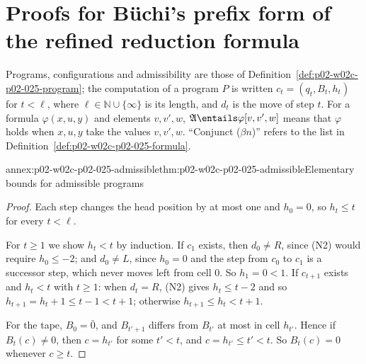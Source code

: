 \section{Proofs for B\"uchi's prefix form of the refined reduction formula}
\label{sec:annex-p02-w02c-p02-025-buchi-form}

Programs, configurations and admissibility are those of
Definition~\ref{def:p02-w02c-p02-025-program}; the computation of a program
\(P\) is written \(c_t=(q_t,B_t,h_t)\) for \(t<\ell\), where
\(\ell\in\mathbb N\cup\{\infty\}\) is its length, and \(d_t\) is the move of
step \(t\).  For a formula \(\varphi(x,u,y)\) and elements \(v,v',w\),
\(\mathfrak A\entails\varphi[v,v',w]\) means that \(\varphi\) holds when
\(x,u,y\) take the values \(v,v',w\).  ``Conjunct (\(\beta\)\(n\))'' refers to
the list in Definition~\ref{def:p02-w02c-p02-025-formula}.

\begin{annexitem}{annex:p02-w02c-p02-025-admissible}{thm:p02-w02c-p02-025-admissible}{Elementary bounds for admissible programs}
\begin{proof}
Each step changes the head position by at most one and \(h_0=0\), so
\(h_t\leq t\) for every \(t<\ell\).

For \(t\geq1\) we show \(h_t<t\) by induction.  If \(c_1\) exists, then
\(d_0\neq R\), since (N2) would require \(h_0\leq-2\); and \(d_0\neq L\), since
\(h_0=0\) and the step from \(c_0\) to \(c_1\) is a successor step, which never
moves left from cell \(0\).  So \(h_1=0<1\).  If \(c_{t+1}\) exists and
\(h_t<t\) with \(t\geq1\): when \(d_t=R\), (N2) gives \(h_t\leq t-2\) and so
\(h_{t+1}=h_t+1\leq t-1<t+1\); otherwise \(h_{t+1}\leq h_t<t+1\).

For the tape, \(B_0=\bar0\), and \(B_{t'+1}\) differs from \(B_{t'}\) at most
in cell \(h_{t'}\).  Hence if \(B_t(c)\neq0\), then \(c=h_{t'}\) for some
\(t'<t\), and \(c=h_{t'}\leq t'<t\).  So \(B_t(c)=0\) whenever \(c\geq t\).
\end{proof}
\end{annexitem}

